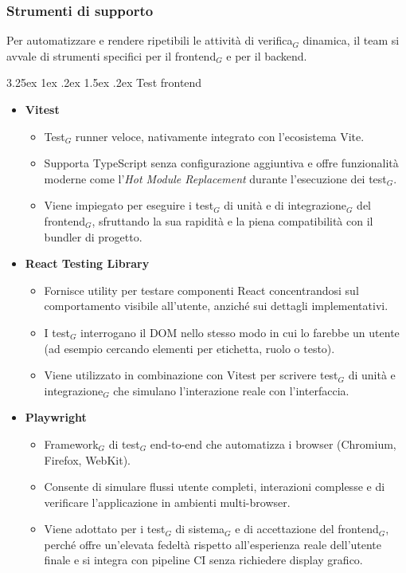 \documentclass[a4paper, 10pt]{article}
\makeatletter
\renewcommand\paragraph{\@startsection{paragraph}{4}{\z@}%
  {3.25ex \@plus1ex \@minus .2ex}%
  {1.5ex \@plus .2ex}%
  {\normalfont\normalsize\bfseries}}
\makeatother
\begin{document}
\subsubsection{Strumenti di supporto}
\label{subsec:strumenti_supporto}

Per automatizzare e rendere ripetibili le attività di verifica$_G$ dinamica, il team si avvale di strumenti specifici per il frontend$_G$ e per il backend.

\paragraph{Test frontend}
\begin{itemize}
    \item \textbf{Vitest}
    \begin{itemize}
        \item Test$_G$ runner veloce, nativamente integrato con l'ecosistema Vite.
        \item Supporta TypeScript senza configurazione aggiuntiva e offre funzionalità moderne come l'\emph{Hot Module Replacement} durante l'esecuzione dei test$_G$.
        \item Viene impiegato per eseguire i test$_G$ di unità e di integrazione$_G$ del frontend$_G$, sfruttando la sua rapidità e la piena compatibilità con il bundler di progetto.
    \end{itemize}
    \item \textbf{React Testing Library}
    \begin{itemize}
        \item Fornisce utility per testare componenti React concentrandosi sul comportamento visibile all'utente, anziché sui dettagli implementativi.
        \item I test$_G$ interrogano il DOM nello stesso modo in cui lo farebbe un utente (ad esempio cercando elementi per etichetta, ruolo o testo).
        \item Viene utilizzato in combinazione con Vitest per scrivere test$_G$ di unità e integrazione$_G$ che simulano l'interazione reale con l'interfaccia.
    \end{itemize}
    \item \textbf{Playwright}
    \begin{itemize}
        \item Framework$_G$ di test$_G$ end-to-end che automatizza i browser (Chromium, Firefox, WebKit).
        \item Consente di simulare flussi utente completi, interazioni complesse e di verificare l'applicazione in ambienti multi-browser.
        \item Viene adottato per i test$_G$ di sistema$_G$ e di accettazione del frontend$_G$, perché offre un'elevata fedeltà rispetto all'esperienza reale dell'utente finale e si integra con pipeline CI senza richiedere display grafico.
    \end{itemize}
\end{itemize}
\end{document}
